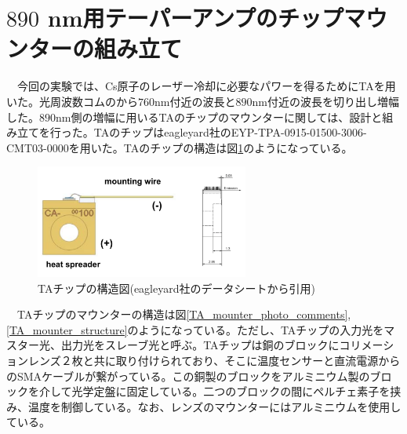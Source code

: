 \documentclass[uplatex, dvipdfmx, a4paper, report, papersize, 11pt]{jsbook}
\begin{document}
\section{$890$ nm用テーパーアンプのチップマウンターの組み立て}
　今回の実験では、Cs原子のレーザー冷却に必要なパワーを得るためにTAを用いた。光周波数コムのから$760 \mathrm{nm}$付近の波長と$890 \mathrm{nm}$付近の波長を切り出し増幅した。$890 \mathrm{nm}$側の増幅に用いるTAのチップのマウンターに関しては、設計と組み立てを行った。TAのチップはeagleyard社のEYP-TPA-0915-01500-3006-CMT03-0000を用いた。TAのチップの構造は図\ref{TA_chip_ds}のようになっている。\\
\begin{figure}[htbp]
 \begin{center}
  \includegraphics[width=70mm]{figures/chapter4/TA_chip_ds.png}
\end{center}
 \caption{TAチップの構造図(eagleyard社のデータシートから引用)}
 \label{TA_chip_ds}
\end{figure}
　TAチップのマウンターの構造は図\ref{TA_mounter_photo_comments},\ref{TA_mounter_structure}のようになっている。ただし、TAチップの入力光をマスター光、出力光をスレーブ光と呼ぶ。TAチップは銅のブロックにコリメーションレンズ２枚と共に取り付けられており、そこに温度センサーと直流電源からのSMAケーブルが繋がっている。この銅製のブロックをアルミニウム製のブロックを介して光学定盤に固定している。二つのブロックの間にペルチェ素子を挟み、温度を制御している。なお、レンズのマウンターにはアルミニウムを使用している。
\end{document}
